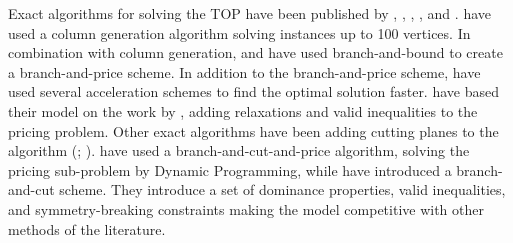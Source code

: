 Exact algorithms for solving the TOP have been published by \citet{butt_optimal_1999}, \citet{boussier_exact_2007}, \citet{poggi_team_2010}, \citet{dang_effective_2013}, and \citet{keshtkaran_enhanced_2016}. \citet{butt_optimal_1999} have used a column generation algorithm solving instances up to 100 vertices. In combination with column generation, \citet{boussier_exact_2007} and \citet{keshtkaran_enhanced_2016} have used branch-and-bound to create a branch-and-price scheme. In addition to the branch-and-price scheme, \citet{boussier_exact_2007} have used several acceleration schemes to find the optimal solution faster. \citet{keshtkaran_enhanced_2016} have based their model on the work by \citet{boussier_exact_2007}, adding relaxations and valid inequalities to the pricing problem. Other exact algorithms have been adding cutting planes to the algorithm (\cite{dang_effective_2013}; \citet{poggi_team_2010}). \citet{poggi_team_2010} have used a branch-and-cut-and-price algorithm, solving the pricing sub-problem by Dynamic Programming, while \citet{dang_effective_2013} have introduced a branch-and-cut scheme. They introduce a set of dominance properties, valid inequalities, and symmetry-breaking constraints making the model competitive with other methods of the literature.

